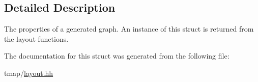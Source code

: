 \subsection{Detailed Description}
The properties of a generated graph. An instance of this struct is returned from the layout functions. 

The documentation for this struct was generated from the following file\+:\begin{DoxyCompactItemize}
\item 
tmap/\hyperlink{layout_8hh}{layout.\+hh}\end{DoxyCompactItemize}

